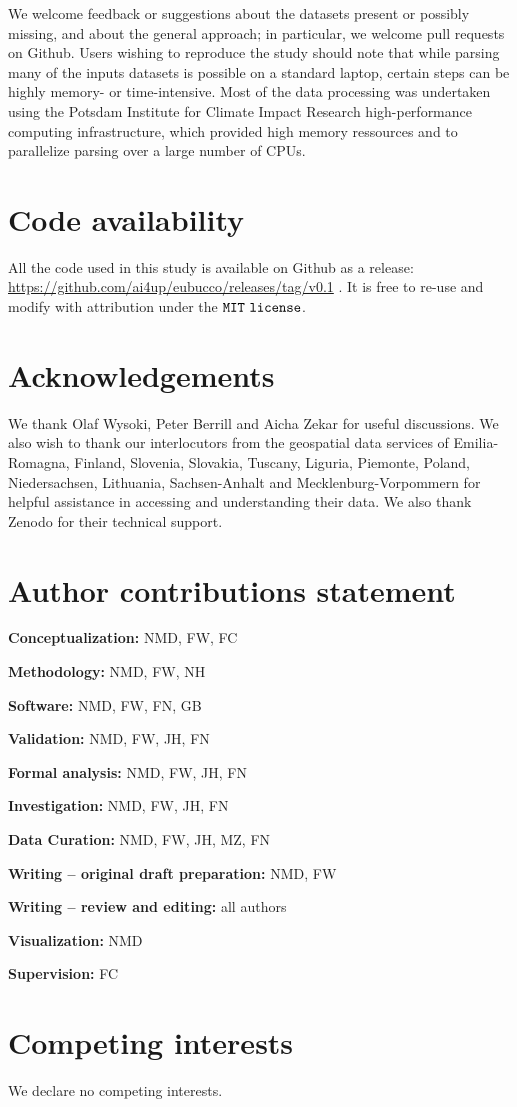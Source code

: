 \documentclass[fleqn,10pt]{wlscirep}
\begin{document}
We welcome feedback or suggestions about the datasets present or possibly missing, and about the general approach; in particular, we welcome pull requests on Github. Users wishing to reproduce the study should note that while parsing many of the inputs datasets is possible on a standard laptop, certain steps can be highly memory- or time-intensive. Most of the data processing was undertaken using the Potsdam Institute for Climate Impact Research high-performance computing infrastructure, which provided high memory ressources and to parallelize parsing over a large number of CPUs.

\section*{Code availability}

All the code used in this study is available on Github as a release: \url{https://github.com/ai4up/eubucco/releases/tag/v0.1} \cite{eubucco-0.1-code2022}. It is free to re-use and modify with attribution under the ${\tt MIT\ license}$.





\section*{Acknowledgements} 

We thank Olaf Wysoki, Peter Berrill and Aicha Zekar for useful discussions. We also wish to thank our interlocutors from the geospatial data services of Emilia-Romagna, Finland, Slovenia, Slovakia, Tuscany, Liguria, Piemonte, Poland, Niedersachsen, Lithuania, Sachsen-Anhalt and Mecklenburg-Vorpommern  for helpful assistance in accessing and understanding their data. We also thank Zenodo for their technical support.


\section*{Author contributions statement}

\textbf{Conceptualization:} NMD, FW, FC

\noindent \textbf{Methodology:} NMD, FW, NH 	

\noindent \textbf{Software:} NMD, FW, FN, GB	

\noindent \textbf{Validation:} NMD, FW, JH, FN	

\noindent \textbf{Formal analysis:} NMD, FW, JH, FN	

\noindent \textbf{Investigation:} NMD, FW, JH, FN

\noindent \textbf{Data Curation:} NMD, FW, JH, MZ, FN

\noindent \textbf{Writing – original draft preparation:} NMD, FW	

\noindent \textbf{Writing – review and editing:} all authors  

\noindent \textbf{Visualization:} NMD	

\noindent \textbf{Supervision:} FC


\section*{Competing interests}

We declare no competing interests.
\end{document}

